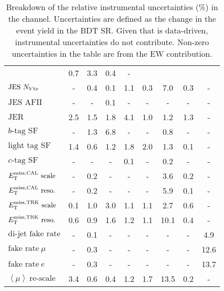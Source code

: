 \begin{table}[p!]
\begin{center}
{\begin{tabular}{l || c c | c c c c c c }
& 0.7 & 3.3 & 0.4 & - \\
$\textrm{JES}~N_{Vtx}$ & - & 0.4 & 0.1 & 1.1 & 0.3 & 7.0 & 0.3 & - \\
$\textrm{JES AFII}$ & - & - & 0.1 & - & - & - & - & - \\
$\textrm{JER}$ & 2.5 & 1.5 & 1.8 & 4.1 & 1.0 & 1.2 & 1.3 & - \\
$b\textrm{-tag SF}$ & - & 1.3 & 6.8 & - & - & 0.8 & - & - \\
$\textrm{light tag SF}$ & 1.4 & 0.6 & 1.2 & 1.8 & 2.0 & 1.3 & 0.1 & -
\\
$c\textrm{-tag SF}$ & - & - & - & 0.1 & - & 0.2 & - & - \\
$E_{\mathrm{T}}^{\rm miss, CAL}~\textrm{scale}$ & - & 0.2 & - & - & - & 3.6 & 0.2 & - \\
$E_{\mathrm{T}}^{\rm miss, CAL}~\textrm{reso.}$ & - & 0.2 & - & - & - & 5.9 & 0.1 & - \\
$E_{\rm T}^{\rm miss, TRK}~\textrm{scale}$ & 0.1 & 1.0 & 3.0 & 1.1 & 1.1 & 2.7 & 0.6 & -
\\
$E_{\rm T}^{\rm miss, TRK}~\textrm{reso.}$ & 0.6 & 0.9 & 1.6 & 1.2 & 1.1 & 10.1 & 0.4 &
- \\
$\textrm{di-jet fake rate}$ & - & 0.1 & - & - & - & - & - & 4.9 \\
$\textrm{fake rate}~\mu$ & - & 0.3 & - & - & - & - & - & 12.6 \\
$\textrm{fake rate}~e$ & - & 0.3 & - & - & - & - & - & 13.7 \\
$\left \langle \mu \right \rangle~\textrm{re-scale}$ & 3.4 & 0.6 & 0.4
& 1.2 & 1.7 & 13.5 & 0.2 & - \\
\hline
\end{tabular}
}
\caption[Instrumental uncertainty summary in the \eemm
  channel.]{Breakdown of the relative instrumental uncertainties (\%) in the \eemm
  channel. Uncertainties are defined as the change in the event yield
  in the BDT SR. Given that \ZDYll is data-driven, instrumental
  uncertainties do not contribute. Non-zero \ZDY uncertainties in the
  table are from the EW contribution.}
\label{chap:analysis:tab:exp_sys_sf}
\end{center}
\end{table}
